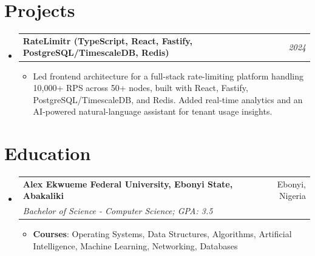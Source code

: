 \documentclass[a4paper]{article}
\makeatletter
\newcommand{\resumeItem}[2]{ \item\small{ \textbf{#1}: #2 } }
\newcommand{\resumeSubheading}[4]{
\vspace{-1pt}
\item[]
\begin{tabular*}{0.97\textwidth}{l@{\extracolsep{\fill}}r}
	\textbf{#1} & #2          \\
	\textit{#3} & \textit{#4} \\
\end{tabular*}
\vspace{1pt}
}
\newcommand{\resumeProjectHeading}[2]{ %
\vspace{2pt}
\item[]
\begin{tabular*}{0.97\textwidth}{l@{\extracolsep{\fill}}r}
	\textbf{#1} & \textit{#2} \\
\end{tabular*}
\vspace{0pt}
}
\newcommand{\resumeSubHeadingListStart}{\begin{itemize}[leftmargin=*,topsep=1pt]}
\newcommand{\resumeSubHeadingListEnd}{\end{itemize}}
\newcommand{\resumeItemListStart}{\begin{itemize}[topsep=0pt,itemsep=0pt,parsep=0pt]}
\newcommand{\resumeItemListEnd}{\end{itemize}}
\makeatother
\begin{document}
	\section{Projects}
	\resumeSubHeadingListStart
	\resumeProjectHeading{RateLimitr (TypeScript, React, Fastify, PostgreSQL/TimescaleDB, Redis)}{2024}
	\resumeItemListStart
	\item\small{Led frontend architecture for a full-stack rate-limiting platform handling 10,000+ RPS across 50+ nodes, built with React, Fastify, PostgreSQL/TimescaleDB, and Redis. Added real-time analytics and an AI-powered natural-language assistant for tenant usage insights.}
	\resumeItemListEnd
	\resumeSubHeadingListEnd

	\section{Education}
	\resumeSubHeadingListStart
	\resumeSubheading
	{Alex Ekwueme Federal University, Ebonyi State, Abakaliki}{Ebonyi, Nigeria}
	{Bachelor of Science - Computer Science; GPA: 3.5}{}
	\resumeItemListStart
	\resumeItem{Courses}{Operating Systems, Data Structures, Algorithms, Artificial Intelligence, Machine Learning, Networking, Databases}
	\resumeItemListEnd
	\resumeSubHeadingListEnd
\end{document}
